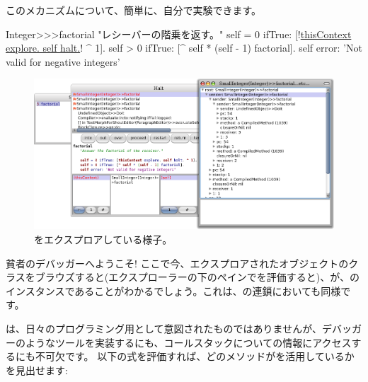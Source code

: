 \documentclass[a4paper,10pt,twoside]{book}
\begin{document}
このメカニズムについて、簡単に、自分で実験できます。


\begin{code}{}
Integer>>>factorial
	"レシーバーの階乗を返す。"
	self = 0 ifTrue: [!\underline{thisContext explore. self halt.}! ^ 1].
	self > 0 ifTrue: [^ self * (self - 1) factorial].
	self error: 'Not valid for negative integers'
\end{code}


\begin{figure}[ht]\centering
	\includegraphics[width=\linewidth]{exploringThisContext}
	\caption{をエクスプロアしている様子。}
\end{figure}

貧者のデバッガーへようこそ!
ここで今、エクスプロアされたオブジェクトのクラスをブラウズすると(\ie エクスプローラーの下のペインでを評価すると)、が、のインスタンスであることがわかるでしょう。これは、の連鎖においても同様です。

は、日々のプログラミング用として意図されたものではありませんが、デバッガーのようなツールを実装するにも、コールスタックについての情報にアクセスするにも不可欠です。
以下の式を評価すれば、どのメソッドがを活用しているかを見出せます:
\end{document}
